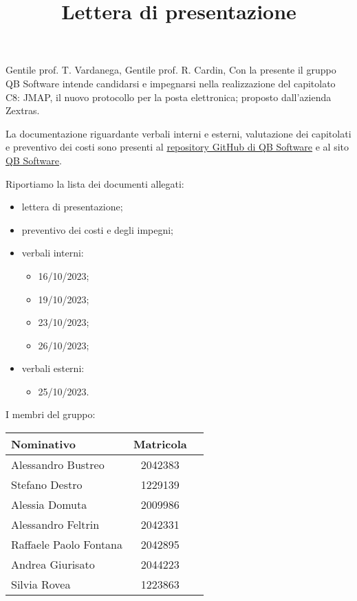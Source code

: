 \documentclass[12pt]{article}
\title{Lettera di presentazione}
\begin{document}
	\makefirstpage
	
	
	\clearpage
	
	
	\noindent
	Gentile prof. T. Vardanega,
	\newline
	Gentile prof. R. Cardin,
	\newline\newline
	Con la presente il gruppo QB Software intende candidarsi e impegnarsi nella realizzazione del capitolato C8: JMAP, il nuovo protocollo per la posta elettronica; proposto dall’azienda Zextras.
	
	La documentazione riguardante verbali interni e esterni, valutazione dei capitolati e preventivo dei costi sono presenti al \href{https://github.com/QB-Software-swe/docs}{repository GitHub di QB Software} e al sito \href{https://qb-software-swe.github.io/docs/site/index.html}{QB Software}.
	
	Riportiamo la lista dei documenti allegati:
	\begin{itemize}
		\item lettera di presentazione;
		\item preventivo dei costi e degli impegni;
		\item verbali interni:
		\begin{itemize}
			\item 16/10/2023;
			\item 19/10/2023;
			\item 23/10/2023;
			\item 26/10/2023;
		\end{itemize}
		\item verbali esterni:
		\begin{itemize}
			\item 25/10/2023.
		\end{itemize}
	\end{itemize}
	
	\noindent
	I membri del gruppo:
	\begin{table}[H]
		\center
		\begin{tabularx}{0.90\textwidth}{XcX}
			\toprule
			\textbf{Nominativo} & \textbf{Matricola}
			\\\midrule
			Alessandro Bustreo & 2042383
			\\%
			Stefano Destro & 1229139
			\\%
			Alessia Domuta & 2009986
			\\%
			Alessandro Feltrin & 2042331
			\\%
			Raffaele Paolo Fontana & 2042895
			\\%
			Andrea Giurisato & 2044223
			\\%
			Silvia Rovea & 1223863
			\\\bottomrule
		\end{tabularx}
	\end{table}
	
\end{document}
